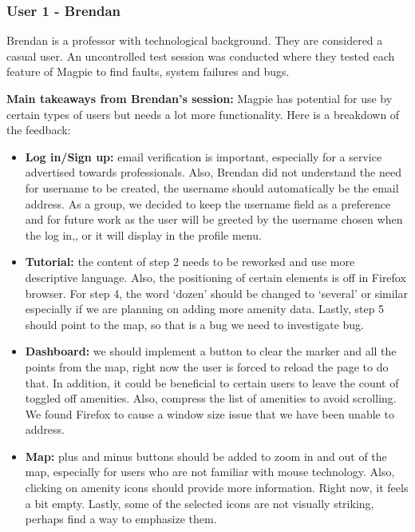 \subsubsection{User 1 - Brendan}
Brendan is a professor with technological background. They are considered a
casual user.
An uncontrolled test session was conducted where they tested each feature of
Magpie to find faults, system failures and bugs.

\textbf{Main takeaways from Brendan's session: }Magpie has potential for use by certain types of users but needs a lot more functionality. Here is a breakdown of the feedback:
\begin{itemize}
    \item \textbf{Log in/Sign up: } email verification is important, especially
    for a service advertised towards professionals. Also, Brendan did not
    understand the need for username to be created, the username should
    automatically be the email address. As a group, we decided to keep the
    username field as a preference and for future work as the user will be
    greeted by the username chosen when the log in,, or it will display in the
    profile menu.
    \vspace{0.2cm}

    \item \textbf{Tutorial: }the content of step 2 needs to be reworked and use
    more descriptive language. Also, the positioning of certain elements is off
    in Firefox browser. For step 4, the word `dozen' should be changed to
    `several' or similar especially if we are planning on adding more amenity
    data. Lastly, step 5 should point to the map, so that is a bug we need to
    investigate bug.
    \vspace{0.2cm}

    \item \textbf{Dashboard: }we should implement a button to clear the marker
    and all the points from the map, right now the user is forced to reload the
    page to do that. In addition, it could be beneficial to certain users to
    leave the count of toggled off amenities. Also, compress the list of
    amenities to avoid scrolling. We found Firefox to cause a window size
    issue that we have been unable to address.
    \vspace{0.2cm}

    \item \textbf{Map: } plus and minus buttons should be added to zoom in and
    out of the map, especially for users who are not familiar with mouse
    technology. Also, clicking on amenity icons should provide more information.
    Right now, it feels a bit empty. Lastly, some of the selected icons are not
    visually striking, perhaps find a way to emphasize them.
    \vspace{0.2cm}


\end{itemize}
